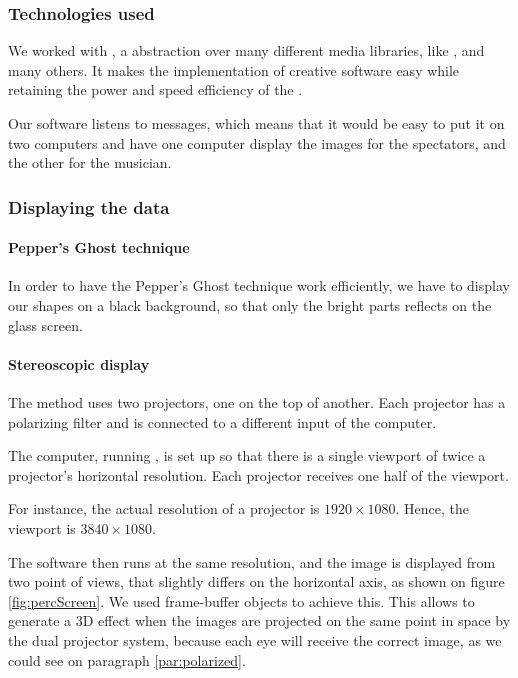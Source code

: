 \subsubsection{Technologies used}
We worked with , a  abstraction over many different media libraries, like ,  and many others. It makes the implementation of creative software easy while retaining the power and speed efficiency of the .

Our software listens to  messages, which means that it would be easy to put it on two computers and have one computer display the images for the spectators, and the other for the musician.

\subsubsection{Displaying the data}
\paragraph{Pepper's Ghost technique}
In order to have the Pepper's Ghost technique work efficiently, we have to display our shapes on a black background, so that only the bright parts reflects on the glass screen.

\paragraph{Stereoscopic display}
The method uses two projectors, one on the top of another.
Each projector has a polarizing filter and is connected to a different input of the computer.

The computer, running , is set up so that there is a single viewport of twice a projector's horizontal resolution. Each projector receives one half of the viewport.

For instance, the actual resolution of a projector is $1920 \times 1080$. Hence, the viewport is $3840 \times 1080$.

The software then runs at the same resolution, and the image is displayed from two point of views, that slightly differs on the horizontal axis, as shown on figure \ref{fig:percScreen}. We used frame-buffer objects to achieve this. This allows to generate a 3D effect when the images are projected on the same point in space by the dual projector system, because each eye will receive the correct image, as we could see on paragraph \ref{par:polarized}.

